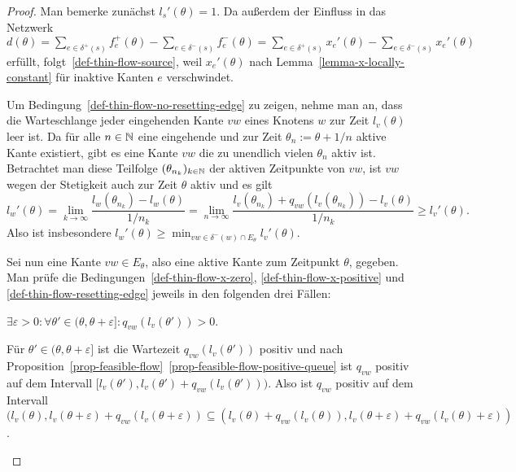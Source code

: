 \begin{proof}
	Man bemerke zunächst $l_s'(\theta) = 1$.
	Da außerdem der Einfluss in das Netzwerk $d(\theta)=  \sum_{e\in \delta^+(s)} f_e^+(\theta) - \sum_{e\in\delta^-(s)} f_e^-(\theta) = \sum_{e\in \delta^+(s)} x_e'(\theta) - \sum_{e\in\delta^-(s)} x_e'(\theta)$ erfüllt, folgt~\ref{def-thin-flow-source}, weil $x_e'(\theta)$ nach Lemma~\ref{lemma-x-locally-constant} für inaktive Kanten $e$ verschwindet.
	
	Um Bedingung~\ref{def-thin-flow-no-resetting-edge} zu zeigen,
	nehme man an, dass die Warteschlange jeder eingehenden Kante $vw$ eines Knotens $w$ zur Zeit $l_v(\theta)$ leer ist.
	Da für alle $n\in\mathbb{N}$ eine eingehende und zur Zeit $\theta_n := \theta + 1/n$ aktive Kante existiert, gibt es eine Kante $vw$ die zu unendlich vielen $\theta_n$ aktiv ist.
	Betrachtet man diese Teilfolge $(\theta_{n_k})_{k\in\mathbb{N}}$ der aktiven Zeitpunkte von $vw$, ist $vw$ wegen der Stetigkeit auch zur Zeit $\theta$ aktiv und es gilt 
	\[
	l_w'(\theta) = \lim_{k\to\infty} \frac{l_w(\theta_{n_k})- l_w(\theta)}{1/n_k} = \lim_{n\to\infty} \frac{ l_v(\theta_{n_k}) + q_{vw}(l_v(\theta_{n_k})) - l_v(\theta) }{1/n_k} \geq l_v'(\theta).
	\]
	Also ist insbesondere $l_w'(\theta) \geq \min_{vw\in \delta^-(w)\cap E_\theta} l_v'(\theta)$.
	
	Sei nun eine Kante $vw\in E_\theta$, also eine aktive Kante zum Zeitpunkt $\theta$, gegeben. Man prüfe die Bedingungen~\ref{def-thin-flow-x-zero}, \ref{def-thin-flow-x-positive} und \ref{def-thin-flow-resetting-edge} jeweils in den folgenden drei Fällen:
	
	\begin{description}[leftmargin=0cm, topsep=0cm, itemindent=0.5cm]
		\item[1. Fall:] $\exists \varepsilon > 0:\forall \theta'\in (\theta, \theta + \varepsilon ] : q_{vw}(l_v(\theta')) > 0$.
		
		Für $\theta'\in(\theta,\theta+\varepsilon]$ ist die Wartezeit $q_{vw}(l_v(\theta'))$ positiv und nach Proposition~\ref{prop-feasible-flow}~\ref{prop-feasible-flow-positive-queue} ist $q_{vw}$ positiv auf dem Intervall $[ l_v(\theta') , l_v(\theta')+q_{vw}(l_v(\theta')) )$.
		Also ist $q_{vw}$ positiv auf dem Intervall $( l_v(\theta) , l_v(\theta + \varepsilon) + q_{vw}(l_v(\theta + \varepsilon) )
		\subseteq ( l_v(\theta) + q_{vw}(l_v(\theta)) , l_v(\theta + \varepsilon) + q_{vw}(l_v(\theta) + \varepsilon ) )$.
		

\end{description}
\end{proof}
